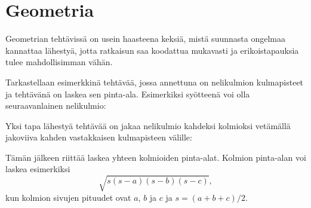 \chapter{Geometria}


Geometrian tehtävissä on usein haasteena keksiä,
mistä suunnasta ongelmaa kannattaa lähestyä,
jotta ratkaisun saa koodattua mukavasti ja
erikoistapauksia tulee mahdollisimman vähän.

Tarkastellaan esimerkkinä tehtävää,
jossa annettuna on nelikulmion kulmapisteet
ja tehtävänä on laskea sen pinta-ala.
Esimerkiksi syötteenä voi olla
seuraavanlainen nelikulmio:

\begin{center}
\end{center}
Yksi tapa lähestyä tehtävää on jakaa nelikulmio
kahdeksi kolmioksi vetämällä jakoviiva kahden
vastakkaisen kulmapisteen välille:
\begin{center}
\end{center}
Tämän jälkeen riittää laskea yhteen kolmioiden
pinta-alat. Kolmion pinta-alan voi laskea
esimerkiksi 
\[ \sqrt{s (s-a) (s-b) (s-c)},\]
kun kolmion sivujen pituudet ovat
$a$, $b$ ja $c$ ja $s=(a+b+c)/2$.

